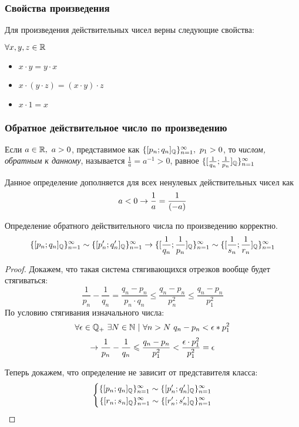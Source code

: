 \subsubsection{Свойства произведения}

Для произведения действительных чисел верны следующие свойства:

$\forall x, y, z \in \mathbb{R}$
\begin{itemize}
    \item $x \cdot y = y \cdot x$
    \item $x \cdot (y \cdot z) = (x \cdot y) \cdot z$
    \item $x \cdot 1 = x$
\end{itemize}

\subsubsection{Обратное действительное число по произведению}

\begin{definition}
    Если $a \in \mathbb{R},\ a > 0$, представимое как $\{[p_n; q_n]_{\mathbb{Q}}\}_{n = 1}^\infty,\ p_1 > 0$, то \textit{числом, обратным к данному}, называется $\frac{1}{a} = a^{-1} > 0$, равное $\{[\frac{1}{q_n};\frac{1}{p_n}]_{\mathbb{Q}}\}_{n = 1}^\infty$
\end{definition}

Данное определение дополняется для всех ненулевых действительных чисел как
$$
    a < 0 \rightarrow \frac{1}{a} = \frac{1}{(-a)}
$$

\begin{proposition}
    Определение обратного действительного числа по произведению корректно.
    $$
        \{[p_n; q_n]_{\mathbb{Q}}\}_{n = 1}^\infty \sim \{[p'_n; q'_n]_{\mathbb{Q}}\}_{n = 1}^\infty \rightarrow \{[\frac{1}{q_n}; \frac{1}{p_n}]_{\mathbb{Q}}\}_{n = 1}^\infty \sim \{[\frac{1}{s_n}; \frac{1}{r_n}]_{\mathbb{Q}}\}_{n = 1}^\infty
    $$
\end{proposition}

\begin{proof}
    Докажем, что такая система стягивающихся отрезков вообще будет стягиваться:
    $$
        \frac{1}{p_n} - \frac{1}{q_n} = \frac{q_n - p_n}{p_n \cdot q_n} \le \frac{q_n - p_n}{p^2_n} \le \frac{q_n - p_n}{p^2_1}
    $$
    По условию стягивания изначального числа:
    $$
        \forall \veps \in \Q_+\ \exists N \in \N\ |\ \forall n > N\ q_n - p_n < \veps * p^2_1
    $$
    $$
        \rightarrow \frac{1}{p_n} - \frac{1}{q_n} \leqslant \frac{q_n - p_n}{p^2_1} < \frac{\epsilon \cdot p^2_1}{p^2_1} = \epsilon
    $$
    
    Теперь докажем, что определение не зависит от представителя класса:
    $$
        \left\{\begin{aligned}\{[p_n; q_n]_{\mathbb{Q}}\}_{n = 1}^\infty \sim \{[p'_n; q'_n]_{\mathbb{Q}}\}_{n = 1}^\infty \\ 
            \{[r_n; s_n]_{\mathbb{Q}}\}_{n = 1}^\infty \sim \{[r'_n; s'_n]_{\mathbb{Q}}\}_{n = 1}^\infty\end{aligned}\right.
    $$
\end{proof}